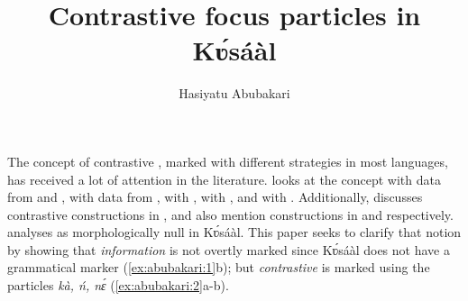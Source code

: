 \documentclass[output=paper
,newtxmath
,modfonts
,nonflat]{langsci/langscibook}
\author{Hasiyatu Abubakari\affiliation{University of Vienna, Austria}}
\title{Contrastive focus particles in Kʋ́sáàl}
\begin{document}
\maketitle

The concept of contrastive , marked with different strategies in most languages, has received a lot of attention in the literature. \citet{ÉKiss1998} looks at the concept with data from  and , \citet{horn1981} with data from , \citet{szabolcsi1981} with , \citet{hartmann2007} with , and \citet{duah2015} with . Additionally, \citet{hudu2012} discusses contrastive  constructions in , \citet{hiraiwa2005} and \citet{hiraiwabodomo2008} also mention  constructions in  and  respectively. \citet{Abubakari2011} analyses  as morphologically null in Kʋ́sáàl. This paper seeks to clarify that notion by showing that \textit{information}  is not overtly marked since Kʋ́sáàl does not have a grammatical  marker (\ref{ex:abubakari:1}b); but \textit{contrastive}  is marked using the particles \textit{kà, ń, nɛ́} (\ref{ex:abubakari:2}a-b). 
\end{document}
